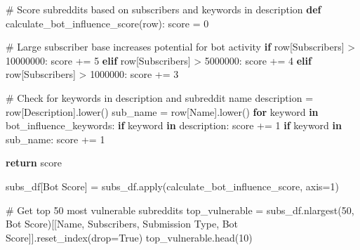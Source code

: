 \documentclass[
  12pt,
  letterpaper,
  DIV=11,
  numbers=noendperiod,
  abstract]{scrartcl}
\newenvironment{Shaded}{\begin{snugshade}}{\end{snugshade}}
\newcommand{\BuiltInTok}[1]{\textcolor[rgb]{0.00,0.23,0.31}{#1}}
\newcommand{\CommentTok}[1]{\textcolor[rgb]{0.37,0.37,0.37}{#1}}
\newcommand{\ControlFlowTok}[1]{\textcolor[rgb]{0.00,0.23,0.31}{\textbf{#1}}}
\newcommand{\DecValTok}[1]{\textcolor[rgb]{0.68,0.00,0.00}{#1}}
\newcommand{\KeywordTok}[1]{\textcolor[rgb]{0.00,0.23,0.31}{\textbf{#1}}}
\newcommand{\NormalTok}[1]{\textcolor[rgb]{0.00,0.23,0.31}{#1}}
\newcommand{\OperatorTok}[1]{\textcolor[rgb]{0.37,0.37,0.37}{#1}}
\newcommand{\StringTok}[1]{\textcolor[rgb]{0.13,0.47,0.30}{#1}}
\newcommand{\VariableTok}[1]{\textcolor[rgb]{0.07,0.07,0.07}{#1}}
\begin{document}
\begin{Shaded}
\begin{Highlighting}[]
\CommentTok{\# Score subreddits based on subscribers and keywords in description}
\KeywordTok{def}\NormalTok{ calculate\_bot\_influence\_score(row):}
\NormalTok{    score }\OperatorTok{=} \DecValTok{0}
    
    \CommentTok{\# Large subscriber base increases potential for bot activity}
    \ControlFlowTok{if}\NormalTok{ row[}\StringTok{\textquotesingle{}Subscribers\textquotesingle{}}\NormalTok{] }\OperatorTok{\textgreater{}} \DecValTok{10000000}\NormalTok{:}
\NormalTok{        score }\OperatorTok{+=} \DecValTok{5}
    \ControlFlowTok{elif}\NormalTok{ row[}\StringTok{\textquotesingle{}Subscribers\textquotesingle{}}\NormalTok{] }\OperatorTok{\textgreater{}} \DecValTok{5000000}\NormalTok{:}
\NormalTok{        score }\OperatorTok{+=} \DecValTok{4}
    \ControlFlowTok{elif}\NormalTok{ row[}\StringTok{\textquotesingle{}Subscribers\textquotesingle{}}\NormalTok{] }\OperatorTok{\textgreater{}} \DecValTok{1000000}\NormalTok{:}
\NormalTok{        score }\OperatorTok{+=} \DecValTok{3}
        
    \CommentTok{\# Check for keywords in description and subreddit name}
\NormalTok{    description }\OperatorTok{=}\NormalTok{ row[}\StringTok{\textquotesingle{}Description\textquotesingle{}}\NormalTok{].lower()}
\NormalTok{    sub\_name }\OperatorTok{=}\NormalTok{ row[}\StringTok{\textquotesingle{}Name\textquotesingle{}}\NormalTok{].lower()}
    \ControlFlowTok{for}\NormalTok{ keyword }\KeywordTok{in}\NormalTok{ bot\_influence\_keywords:}
        \ControlFlowTok{if}\NormalTok{ keyword }\KeywordTok{in}\NormalTok{ description:}
\NormalTok{            score }\OperatorTok{+=} \DecValTok{1}
        \ControlFlowTok{if}\NormalTok{ keyword }\KeywordTok{in}\NormalTok{ sub\_name:}
\NormalTok{            score }\OperatorTok{+=} \DecValTok{1}
            
    \ControlFlowTok{return}\NormalTok{ score}

\NormalTok{subs\_df[}\StringTok{\textquotesingle{}Bot Score\textquotesingle{}}\NormalTok{] }\OperatorTok{=}\NormalTok{ subs\_df.}\BuiltInTok{apply}\NormalTok{(calculate\_bot\_influence\_score, axis}\OperatorTok{=}\DecValTok{1}\NormalTok{)}

\CommentTok{\# Get top 50 most vulnerable subreddits}
\NormalTok{top\_vulnerable }\OperatorTok{=}\NormalTok{ subs\_df.nlargest(}\DecValTok{50}\NormalTok{, }\StringTok{\textquotesingle{}Bot Score\textquotesingle{}}\NormalTok{)[[}\StringTok{\textquotesingle{}Name\textquotesingle{}}\NormalTok{, }\StringTok{\textquotesingle{}Subscribers\textquotesingle{}}\NormalTok{, }\StringTok{\textquotesingle{}Submission Type\textquotesingle{}}\NormalTok{, }\StringTok{\textquotesingle{}Bot Score\textquotesingle{}}\NormalTok{]].reset\_index(drop}\OperatorTok{=}\VariableTok{True}\NormalTok{)}
\NormalTok{top\_vulnerable.head(}\DecValTok{10}\NormalTok{)}
\end{Highlighting}
\end{Shaded}
\end{document}
